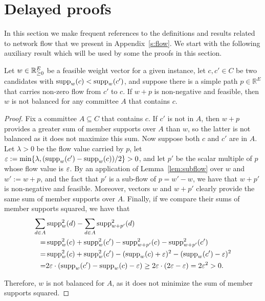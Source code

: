 
\section{Delayed proofs}\label{s:proofs}

In this section we make frequent references to the definitions and results related to network flow that we present in Appendix~\ref{s:flow}. We start with the following auxiliary result which will be used by some the proofs in this section.

\begin{lemma}\label{lem:path}
Let $w\in \mathbb{R}_{\geq 0}^E$ be a feasible weight vector for a given instance, let $c,c'\in C$ be two candidates with $\operatorname{supp}_w(c)<\operatorname{supp}_w(c')$, and suppose there is a simple path $p\in\mathbb{R}^E$ that carries non-zero flow from $c'$ to $c$. If $w+p$ is non-negative and feasible, then $w$ is not balanced for any committee $A$ that contains $c$.
\end{lemma}

\begin{proof}
Fix a committee $A\subseteq C$ that contains $c$. If $c'$ is not in $A$, then $w+p$ provides a greater sum of member supports over $A$ than $w$, so the latter is not balanced as it does not maximize this sum. Now suppose both $c$ and $c'$ are in $A$. Let $\lambda>0$ be the flow value carried by $p$, let $\varepsilon:=\min\{\lambda, (\operatorname{supp}_w(c') - \operatorname{supp}_w(c))/2\}>0$, and let $p'$ be the scalar multiple of $p$ whose flow value is $\varepsilon$. By an application of Lemma~\ref{lem:subflow} over $w$ and $w':=w+p$, and the fact that $p'$ is a sub-flow of $p=w'-w$, we have that $w+p'$ is non-negative and feasible. 
Moreover, vectors $w$ and $w+p'$ clearly provide the same sum of member supports over $A$. Finally, if we compare their sums of member supports squared, we have that
\begin{align*}
\sum_{d\in A} & \operatorname{supp}_w^2(d)-\sum_{d\in A} \operatorname{supp}^2_{w+p'}(d) \\
=& \operatorname{supp}_w^2(c) +\operatorname{supp}_w^2(c')-\operatorname{supp}^2_{w+p'}(c) -\operatorname{supp}^2_{w+p'}(c')\\
=& \operatorname{supp}_w^2(c) +\operatorname{supp}_w^2(c') - (\operatorname{supp}_w(c) + \varepsilon)^2 - (\operatorname{supp}_w(c') - \varepsilon)^2 \\
=& 2\varepsilon\cdot (\operatorname{supp}_w(c') - \operatorname{supp}_w(c) - \varepsilon) \geq 2\varepsilon\cdot(2\varepsilon - \varepsilon)=2\varepsilon^2>0.
\end{align*}

Therefore, $w$ is not balanced for $A$, as it does not minimize the sum of member supports squared.  
\end{proof}

